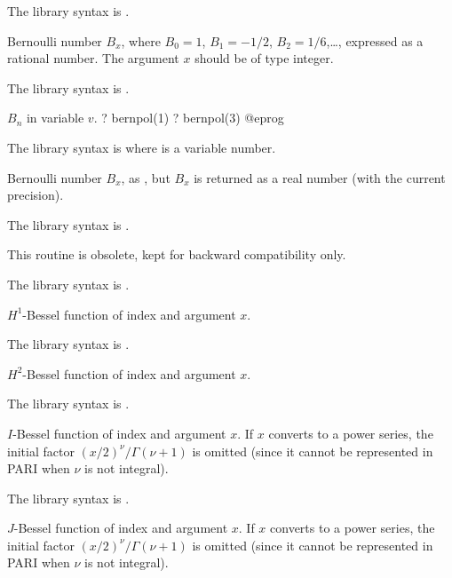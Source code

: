 The library syntax is .

\label{se:bernfrac}
Bernoulli number $B_x$,
where $B_0=1$, $B_1=-1/2$, $B_2=1/6$,\dots, expressed as a rational number.
The argument $x$ should be of type integer.

The library syntax is .

\label{se:bernpol}
 $B_n$ in variable $v$.
\bprog
? bernpol(1)
? bernpol(3)
@eprog

The library syntax is  where  is a variable number.

\label{se:bernreal}
Bernoulli number
$B_x$, as , but $B_x$ is returned as a real number
(with the current precision).

The library syntax is .

\label{se:bernvec}
This routine is obsolete, kept for backward compatibility only.

The library syntax is .

\label{se:besselh1}
$H^1$-Bessel function of index  and argument $x$.

The library syntax is .

\label{se:besselh2}
$H^2$-Bessel function of index  and argument $x$.

The library syntax is .

\label{se:besseli}
$I$-Bessel function of index  and
argument $x$. If $x$ converts to a power series, the initial factor
$(x/2)^\nu/\Gamma(\nu+1)$ is omitted (since it cannot be represented in PARI
when $\nu$ is not integral).

The library syntax is .

\label{se:besselj}
$J$-Bessel function of index  and
argument $x$. If $x$ converts to a power series, the initial factor
$(x/2)^\nu/\Gamma(\nu+1)$ is omitted (since it cannot be represented in PARI
when $\nu$ is not integral).


